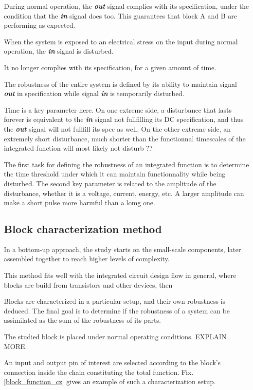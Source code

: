 During normal operation, the \textbf{\textit{out}} signal complies with its specification,
under the condition that the \textbf{\textit{in}} signal does too.
This guarantees that block A and B are performing as expected.

When the system is exposed to an electrical stress on the input during normal operation,
the \textbf{\textit{in}} signal is disturbed.

It no longer complies with its specification, for a given amount of time.

The robustness of the entire system is defined by its ability to maintain signal \textbf{\textit{out}} in specification
while signal \textbf{\textit{in}} is temporarily disturbed.

Time is a key parameter here. On one extreme side, a disturbance that lasts forever is equivalent to the \textbf{\textit{in}} signal not fullfilling its DC specification,
and thus the \textbf{\textit{out}} signal will not fullfill its spec as well.
On the other extreme side, an extremely short disturbance, much shorter than the functionnal timescales of the integrated function will most likely not disturb ??

The first task for defining the robustness of an integrated function is to determine the time threshold under which it can maintain functionnality while being disturbed.
The second key parameter is related to the amplitude of the disturbance, whether it is a voltage, current, energy, etc.
A larger amplitude can make a short pulse more harmful than a lomg one.

\subsection{Block characterization method}

In a bottom-up approach, the study starts on the small-scale components,
later assembled together to reach higher levels of complexity.

This method fits well with the integrated circuit design flow in general,
where blocks are build from transistors and other devices, then

Blocks are characterized in a particular setup, and their own robustness is deduced. The final goal is to determine if the robustness of
a system can be assimilated as the sum of the robustness of its parts.

The studied block is placed under normal operating conditions. EXPLAIN MORE.

An input and output pin of interest are selected according to the block's connection inside the chain constituting the total function.
Fix. \ref{block_function_cz} gives an example of such a characterization setup.

